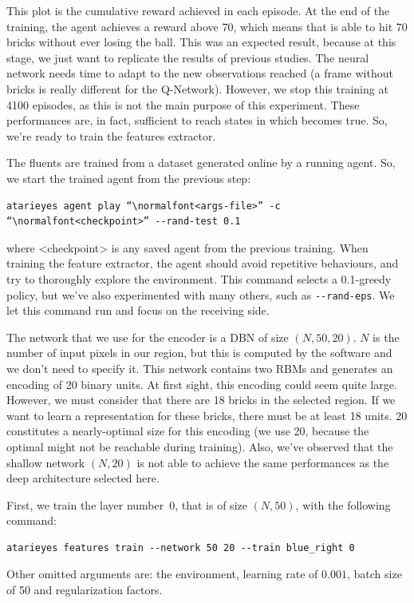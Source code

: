 This plot is the cumulative reward achieved in each episode. At the end of the
training, the agent achieves a reward above 70, which means that is able to
hit 70 bricks without ever losing the ball. This was an expected result,
because at this stage, we just want to replicate the results of previous
studies.  The neural network needs time to adapt to the new observations
reached (a frame without bricks is really different for the Q-Network).
However, we stop this training at 4100 episodes, as this is not the main
purpose of this experiment. These performances are, in fact, sufficient to
reach states in which  becomes true. So, we're ready to train the
features extractor.

The fluents are trained from a dataset generated online by a running agent.
So, we start the trained agent from the previous step:
\begin{verbatim}
atarieyes agent play “\normalfont<args-file>” -c “\normalfont<checkpoint>” --rand-test 0.1
\end{verbatim}
where <checkpoint> is any saved agent from the previous training. When
training the feature extractor, the agent should avoid repetitive behaviours,
and try to thoroughly explore the environment. This command selects a
0.1-greedy policy, but we've also experimented with many others, such as
\verb|--rand-eps|. We let this command run and focus on the receiving side.

The network that we use for the encoder is a DBN of size $(N, 50, 20)$. $N$ is
the number of input pixels in our region, but this is computed by the
software and we don't need to specify it. This network contains two RBMs and
generates an encoding of 20 binary units. At first sight, this encoding could
seem quite large. However, we must consider that there are 18 bricks in the
selected region. If we want to learn a representation for these bricks, there
must be at least 18 units. 20 constitutes a nearly-optimal size for this
encoding (we use 20, because the optimal might not be reachable during
training). Also, we've observed that the shallow network $(N, 20)$ is not able
to achieve the same performances as the deep architecture selected here.

First, we train the layer number~0, that is of size $(N, 50)$, with the
following command:
\begin{verbatim}
atarieyes features train --network 50 20 --train blue_right 0
\end{verbatim}
Other omitted arguments are: the environment, learning rate of $0.001$,
batch size of 50 and regularization factors.

